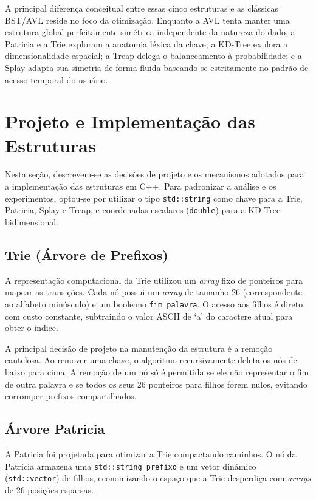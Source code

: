 \documentclass[conference]{IEEEtran}
\begin{document}
A principal diferença conceitual entre essas cinco estruturas e as clássicas BST/AVL reside no foco da otimização. Enquanto a AVL tenta manter uma estrutura global perfeitamente simétrica independente da natureza do dado, a Patricia e a Trie exploram a anatomia léxica da chave; a KD-Tree explora a dimensionalidade espacial; a Treap delega o balanceamento à probabilidade; e a Splay adapta sua simetria de forma fluida baseando-se estritamente no padrão de acesso temporal do usuário.


\section{Projeto e Implementação das Estruturas}

Nesta seção, descrevem-se as decisões de projeto e os mecanismos adotados para a implementação das estruturas em C++. Para padronizar a análise e os experimentos, optou-se por utilizar o tipo \texttt{std::string} como chave para a Trie, Patricia, Splay e Treap, e coordenadas escalares (\texttt{double}) para a KD-Tree bidimensional.

\subsection{Trie (Árvore de Prefixos)}
A representação computacional da Trie utilizou um \textit{array} fixo de ponteiros para mapear as transições. Cada nó possui um \textit{array} de tamanho 26 (correspondente ao alfabeto minúsculo) e um booleano \texttt{fim\_palavra}. O acesso aos filhos é direto, com custo constante, subtraindo o valor ASCII de `a' do caractere atual para obter o índice.

A principal decisão de projeto na manutenção da estrutura é a remoção cautelosa. Ao remover uma chave, o algoritmo recursivamente deleta os nós de baixo para cima. A remoção de um nó só é permitida se ele não representar o fim de outra palavra e se todos os seus 26 ponteiros para filhos forem nulos, evitando corromper prefixos compartilhados.

\subsection{Árvore Patricia}
A Patricia foi projetada para otimizar a Trie compactando caminhos. O nó da Patricia armazena uma \texttt{std::string prefixo} e um vetor dinâmico (\texttt{std::vector}) de filhos, economizando o espaço que a Trie desperdiça com \textit{arrays} de 26 posições esparsas.
\end{document}
